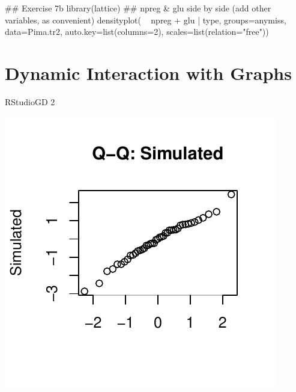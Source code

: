 \documentclass{tufte-book}\usepackage[]{graphicx}\usepackage[]{color}
\begin{document}
\begin{enumerate}
\begin{itemize}
\begin{fullwidth}
\begin{Schunk}
\begin{Sinput}
## Exercise 7b
library(lattice)
## npreg & glu side by side (add other variables, as convenient)
densityplot( ~ npreg + glu | type, groups=anymiss, data=Pima.tr2,
            auto.key=list(columns=2), scales=list(relation="free"))
\end{Sinput}
\end{Schunk}

\end{fullwidth}
\end{itemize}
\end{enumerate}
% 

\cleartooddpage

\chapter{Dynamic Interaction with Graphs}\label{ch:dynamic}



\begin{Schunk}
\begin{Soutput}
RStudioGD 
        2 
\end{Soutput}


\centerline{\includegraphics[width=\textwidth]{figs/09-unnamed-chunk-25-1} }

\end{Schunk}
\end{document}
